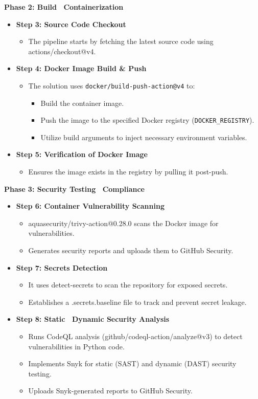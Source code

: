 \documentclass[conference]{IEEEtran}
\begin{document}
\textbf{Phase 2: Build \ Containerization}
\begin{itemize}
\item \textbf{Step 3: Source Code Checkout}
\begin{itemize}
\item The pipeline starts by fetching the latest source code using actions/checkout@v4.
\end{itemize}
\item \textbf{Step 4: Docker Image Build \& Push}
\begin{itemize}
    \item The solution uses \texttt{docker/build-push-action@v4} to:
    \begin{itemize}
        \item Build the container image.
        \item Push the image to the specified Docker registry (\texttt{DOCKER\_REGISTRY}).
        \item Utilize build arguments to inject necessary environment variables.
    \end{itemize}
\end{itemize}
\item \textbf{Step 5: Verification of Docker Image}
\begin{itemize}
\item Ensures the image exists in the registry by pulling it post-push.
\end{itemize}
\end{itemize}

\textbf{Phase 3: Security Testing \ Compliance}
\begin{itemize}
\item \textbf{Step 6: Container Vulnerability Scanning}
\begin{itemize}
\item aquasecurity/trivy-action@0.28.0 scans the Docker image for vulnerabilities.
\item Generates security reports and uploads them to GitHub Security.
\end{itemize}
\item \textbf{Step 7: Secrets Detection}
\begin{itemize}
\item It uses detect-secrets to scan the repository for exposed secrets.
\item Establishes a .secrets.baseline file to track and prevent secret leakage.
\end{itemize}
\item \textbf{Step 8: Static \ Dynamic Security Analysis}
\begin{itemize}
\item Runs CodeQL analysis (github/codeql-action/analyze@v3) to detect vulnerabilities in Python code.
\item Implements Snyk for static (SAST) and dynamic (DAST) security testing.
\item Uploads Snyk-generated reports to GitHub Security.
\end{itemize}
\end{itemize}
\end{document}
